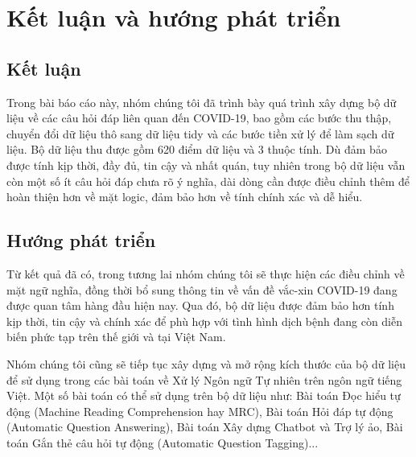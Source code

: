 \documentclass[runningheads]{llncs}
\begin{document}
\section{Kết luận và hướng phát triển}
\subsection{Kết luận}
Trong bài báo cáo này, nhóm chúng tôi đã trình bày quá trình xây dựng bộ dữ liệu về các câu hỏi đáp liên quan đến COVID-19, bao gồm các bước thu thập, chuyển đổi dữ liệu thô sang dữ liệu tidy và các bước tiền xử lý để làm sạch dữ liệu. Bộ dữ liệu thu được gồm 620 điểm dữ liệu và 3 thuộc tính. Dù đảm bảo được tính kịp thời, đầy đủ, tin cậy và nhất quán, tuy nhiên trong bộ dữ liệu vẫn còn một số ít câu hỏi đáp chưa rõ ý nghĩa, dài dòng cần được điều chỉnh thêm để hoàn thiện hơn về mặt logic, đảm bảo hơn về tính chính xác và dễ hiểu.

\subsection{Hướng phát triển}
Từ kết quả đã có, trong tương lai nhóm chúng tôi sẽ thực hiện các điều chỉnh về mặt ngữ nghĩa, đồng thời bổ sung thông tin về vấn đề vắc-xin COVID-19 đang được quan tâm hàng đầu hiện nay. Qua đó, bộ dữ liệu được đảm bảo hơn tính kịp thời, tin cậy và chính xác để phù hợp với tình hình dịch bệnh đang còn diễn biến phức tạp trên thế giới và tại Việt Nam.

Nhóm chúng tôi cũng sẽ tiếp tục xây dựng và mở rộng kích thước của bộ dữ liệu để sử dụng trong các bài toán về Xử lý Ngôn ngữ Tự nhiên trên ngôn ngữ tiếng Việt. Một số bài toán có thể sử dụng trên bộ dữ liệu như: Bài toán Đọc hiểu tự động (Machine Reading Comprehension hay MRC), Bài toán Hỏi đáp tự động (Automatic Question Answering), Bài toán Xây dựng Chatbot và Trợ lý ảo, Bài toán Gắn thẻ câu hỏi tự động (Automatic Question Tagging)...
 
\end{document}
